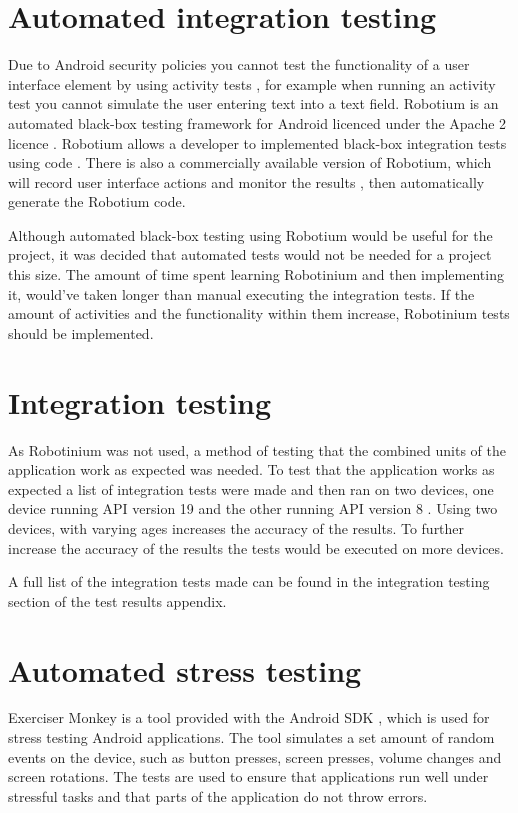 \section{Automated integration testing}

Due to Android security policies you cannot test the functionality of a user interface element by using activity tests \cite{activity_test}, for example when running an activity test you cannot simulate the user entering text into a text field. Robotium is an automated black-box testing framework \cite{robotium} for Android licenced under the Apache 2 licence \cite{apache_licence}. Robotium allows a developer to implemented black-box integration tests using code \cite{robotium}. There is also a commercially available version of Robotium, which will record user interface actions and monitor the results \cite{robotium}, then automatically generate the Robotium code.

Although automated black-box testing using Robotium would be useful for the project, it was decided that automated tests would not be needed for a project this size. The amount of time spent learning Robotinium and then implementing it, would’ve taken longer than manual executing the integration tests. If the amount of activities and the functionality within them increase, Robotinium tests should be implemented.


\section{Integration testing}

As Robotinium was not used, a method of testing that the combined units of the application work as expected was needed. To test that the application works as expected a list of integration tests were made and then ran on two devices, one device running API version 19 and the other running API version 8 \cite{froyo}. Using two devices, with varying ages increases the accuracy of the results. To further increase the accuracy of the results the tests would be executed on more devices.

A full list of the integration tests made can be found in the integration testing section of the test results appendix.

\section{Automated stress testing}

Exerciser Monkey \cite{exciser} is a tool provided with the Android SDK \cite{android_sdk}, which is used for stress testing Android applications. The tool simulates a set amount of random events on the device, such as button presses, screen presses, volume changes and screen rotations. The tests are used to ensure that applications run well under stressful tasks and that parts of the application do not throw errors.

